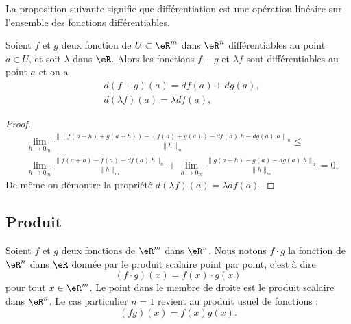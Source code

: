 La proposition suivante signifie que différentiation est une opération linéaire sur l'ensemble des fonctions différentiables. 
\begin{proposition}		\label{PropDiffLineaire}
  Soient $f$ et $g$ deux fonction de $U\subset\eR^m$ dans $\eR^n$ différentiables au point $a\in U$, et soit $\lambda$ dans $\eR$. Alors les fonctions $f+g$ et $\lambda f$ sont différentiables au point $a$ et on a 
  \begin{equation}
    \begin{aligned}
 &     d(f+g)(a)=df(a)+dg(a), \\
& d(\lambda f)(a)=\lambda df(a),
    \end{aligned}
\end{equation}
\end{proposition}
\begin{proof}
  \begin{equation}
    \begin{aligned}
     & \lim_{h\to 0_m}\frac{\left\|\left(f(a+h)+g(a+h)\right)-\left(f(a)+g(a)\right)-df(a).h-dg(a).h\right\|_n}{\|h\|_m}\leq\\
&\lim_{h\to 0_m}\frac{\|f(a+h)-f(a)-df(a).h\|_n}{\|h\|_m}+\lim_{h\to 0_m}\frac{\|g(a+h)-g(a)-dg(a).h\|_n}{\|h\|_m}=0.
    \end{aligned}
  \end{equation}
  De même on démontre la  propriété $d(\lambda f)(a)=\lambda df(a)$.
\end{proof}

\subsection{Produit}

Soient $f$ et $g$ deux fonctions de $\eR^m$ dans $\eR^n$. Nous notons $f\cdot g$ la fonction de $\eR^n$ dans $\eR$ donnée par le produit scalaire point par point, c'est à dire
\begin{equation}
	(f\cdot g)(x)=f(x)\cdot g(x)
\end{equation}
pour tout $x\in\eR^m$. Le point dans le membre de droite est le produit scalaire dans $\eR^n$. Le cas particulier $n=1$ revient au produit usuel de fonctions :
\begin{equation}
	(fg)(x)=f(x)g(x).
\end{equation}

